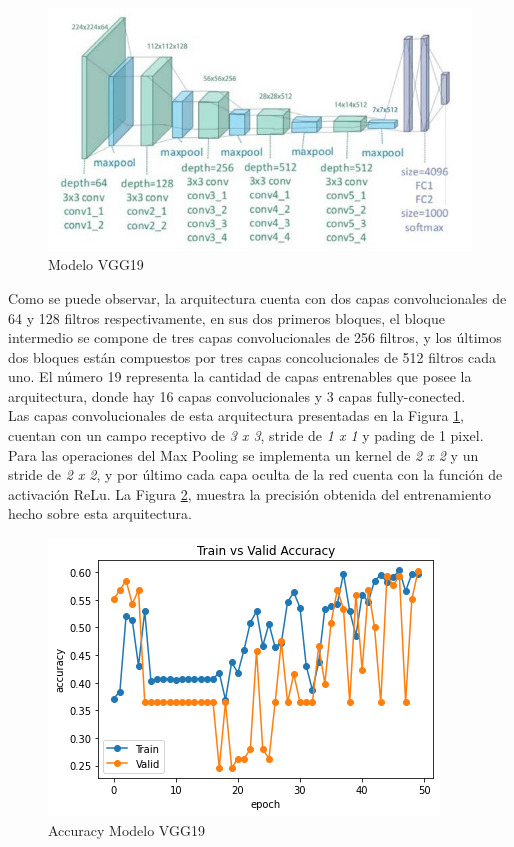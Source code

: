 \newpage
\begin{figure}[ht]
	\centering
	\includegraphics[scale=0.38]{Figs/22.jpeg}
	\caption{Modelo VGG19}
	\label{fig:VGG19}
\end{figure}			


Como se puede observar, la arquitectura cuenta con dos capas convolucionales de 64 y 128 filtros respectivamente, en sus dos primeros bloques, el bloque intermedio se compone de tres capas convolucionales de 256 filtros, y los últimos dos bloques están compuestos por tres capas concolucionales de 512 filtros cada uno. El número 19 representa la cantidad de capas entrenables que posee la arquitectura, donde hay 16 capas convolucionales y 3 capas fully-conected.\\			

Las capas convolucionales de esta arquitectura presentadas en la Figura \ref{fig:VGG19}, cuentan con un campo receptivo de \textit{3 x 3}, stride de \textit{1 x 1} y pading de 1 pixel. Para las operaciones del Max Pooling se implementa un kernel de \textit{2 x 2} y un stride de \textit{2 x 2}, y por último cada capa oculta de la red cuenta con la función de activación ReLu. La Figura \ref{fig:VGG19_accuracy}, muestra la precisión obtenida del entrenamiento hecho sobre esta arquitectura.


\begin{figure}[ht]
	\centering
	\includegraphics[scale=0.5]{Figs/101.png}
	\caption{Accuracy Modelo VGG19}
	\label{fig:VGG19_accuracy}
\end{figure}  

